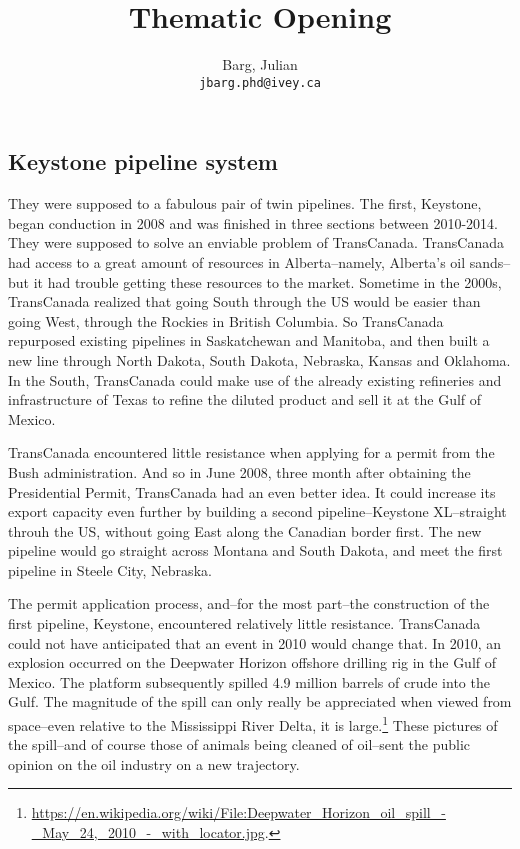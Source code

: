 \documentclass{article}
\title{Thematic Opening}
\author{
	Barg, Julian\\
	\texttt{jbarg.phd@ivey.ca}
}
\begin{document}
	
	\maketitle

	\subsection*{Keystone pipeline system}

	They were supposed to a fabulous pair of twin pipelines. The first, Keystone, began conduction in 2008 and was finished in three sections between 2010-2014. They were supposed to solve an enviable problem of TransCanada. TransCanada had access to a great amount of resources in Alberta--namely, Alberta's oil sands--but it had trouble getting these resources to the market. Sometime in the 2000s, TransCanada realized that going South through the US would be easier than going West, through the Rockies in British Columbia. So TransCanada repurposed existing pipelines in Saskatchewan and Manitoba, and then built a new line through North Dakota, South Dakota, Nebraska, Kansas and Oklahoma. In the South, TransCanada could make use of the already existing refineries and infrastructure of Texas to refine the diluted product and sell it at the Gulf of Mexico.

	TransCanada encountered little resistance when applying for a permit from the Bush administration. And so in June 2008, three month after obtaining the Presidential Permit, TransCanada had an even better idea. It could increase its export capacity even further by building a second pipeline--Keystone XL--straight throuh the US, without going East along the Canadian border first. The new pipeline would go straight across Montana and South Dakota, and meet the first pipeline in Steele City, Nebraska.

	The permit application process, and--for the most part--the construction of the first pipeline, Keystone, encountered relatively little resistance. TransCanada could not have anticipated that an event in 2010 would change that. In 2010, an explosion occurred on the Deepwater Horizon offshore drilling rig in the Gulf of Mexico. The platform subsequently spilled 4.9 million barrels of crude into the Gulf. The magnitude of the spill can only really be appreciated when viewed from space--even relative to the Mississippi River Delta, it is large.\footnote{\url{https://en.wikipedia.org/wiki/File:Deepwater_Horizon_oil_spill_-_May_24,_2010_-_with_locator.jpg}.} These pictures of the spill--and of course those of animals being cleaned of oil--sent the public opinion on the oil industry on a new trajectory.
\end{document}
